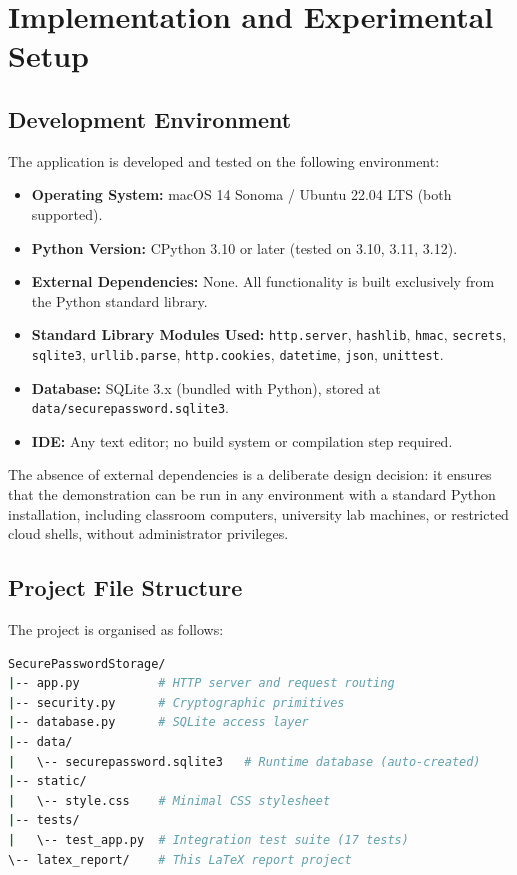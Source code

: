 \chapter{Implementation and Experimental Setup}
\label{chap:implementation}

\section{Development Environment}
\label{sec:impl_env}

The application is developed and tested on the following environment:

\begin{itemize}
  \item \textbf{Operating System:} macOS 14 Sonoma / Ubuntu 22.04 LTS (both supported).
  \item \textbf{Python Version:} CPython 3.10 or later (tested on 3.10, 3.11, 3.12).
  \item \textbf{External Dependencies:} None. All functionality is built exclusively from the Python standard library.
  \item \textbf{Standard Library Modules Used:} \texttt{http.server}, \texttt{hashlib}, \texttt{hmac}, \texttt{secrets}, \texttt{sqlite3}, \texttt{urllib.parse}, \texttt{http.cookies}, \texttt{datetime}, \texttt{json}, \texttt{unittest}.
  \item \textbf{Database:} SQLite 3.x (bundled with Python), stored at \texttt{data/securepassword.sqlite3}.
  \item \textbf{IDE:} Any text editor; no build system or compilation step required.
\end{itemize}

The absence of external dependencies is a deliberate design decision: it ensures that the demonstration can be run in any environment with a standard Python installation, including classroom computers, university lab machines, or restricted cloud shells, without administrator privileges.

\section{Project File Structure}
\label{sec:impl_structure}

The project is organised as follows:

\begin{lstlisting}[language=bash,caption={Project directory layout},label={lst:structure}]
SecurePasswordStorage/
|-- app.py           # HTTP server and request routing
|-- security.py      # Cryptographic primitives
|-- database.py      # SQLite access layer
|-- data/
|   \-- securepassword.sqlite3   # Runtime database (auto-created)
|-- static/
|   \-- style.css    # Minimal CSS stylesheet
|-- tests/
|   \-- test_app.py  # Integration test suite (17 tests)
\-- latex_report/    # This LaTeX report project
\end{lstlisting}


